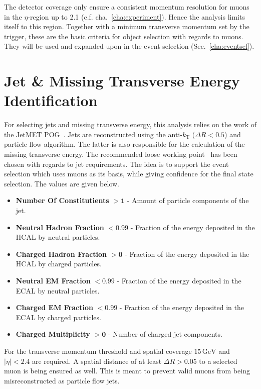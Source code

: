 The detector coverage only ensure a consistent momentum resolution for muons in the $\eta$-region up to 2.1 (c.f. cha.~\ref{cha:experiment}). Hence the analysis limits itself to this region. Together with a minimum transverse momentum set by the trigger, these are the basic criteria for object selection with regards to muons. They will be used and expanded upon in the event selection (Sec.~\ref{cha:eventsel}). 


\section{Jet \& Missing Transverse Energy Identification}
\label{sec:jetid}

For selecting jets and missing transverse energy, this analysis relies on the work of the JetMET POG~\cite{jmepog}. Jets are reconstructed using the anti-$k_{\text{T}}$ ($\Delta R < 0.5$) and particle flow algorithm. The latter is also responsible for the calculation of the missing transverse energy. The recommended loose working point~\cite{jetid, jetidpf} has been chosen with regards to jet requirements. The idea is to support the event selection which uses muons as its basis, while giving confidence for the final state selection. The values are given below.

\begin{itemize}
\item \textbf{Number Of Constitutients} $\mathbf{> 1}$ - Amount of particle components of the jet.
\item \textbf{Neutral Hadron Fraction} $\mathbf{< 0.99}$ - Fraction of the energy deposited in the HCAL by neutral particles.
\item \textbf{Charged Hadron Fraction} $\mathbf{> 0}$ - Fraction of the energy deposited in the HCAL by charged particles.
\item \textbf{Neutral EM Fraction} $\mathbf{< 0.99}$ - Fraction of the energy deposited in the ECAL by neutral particles.
\item \textbf{Charged EM Fraction} $\mathbf{< 0.99}$ - Fraction of the energy deposited in the ECAL by charged particles.
\item \textbf{Charged Multiplicity} $\mathbf{> 0}$ - Number of charged jet components.
\end{itemize}

For the transverse momentum threshold and spatial coverage $15\,\text{GeV}$ and $|\eta|  < 2.4$ are required. A spatial distance of at least $\Delta R > 0.05$ to a selected muon is being ensured as well. This is meant to prevent valid muons from being misreconstructed as particle flow jets. 

